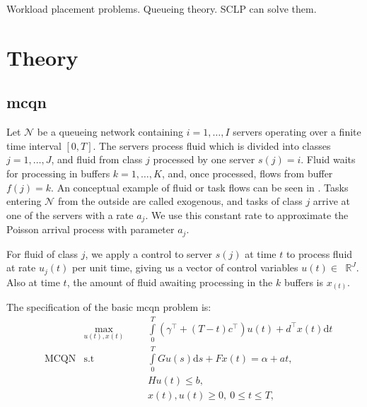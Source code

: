 \documentclass[11pt,a4paper,titlepage]{article}
\newcommand*{\RR}[1]{\ensuremath{\mathop{}\!\mathbb{R}^{#1}}}%
\newcommand*{\qnet}{\ensuremath{\mathcal{N}}}%
\theoremstyle{definition}
\begin{document}
Workload placement problems.
Queueing theory.
SCLP can solve them.



\section{Theory}
\label{sec:theory}


\subsection{\acrshort{mcqn}}
\label{subsec:theory:mcqn}

Let $\qnet$ be a queueing network containing $i = 1, \ldots, I$
servers operating over a finite time interval $[0,T]$.
The servers process fluid which is divided into classes $j = 1, \ldots, J$,
and fluid from class $j$ processed by one server $s(j) = i$.
Fluid waits for processing in buffers $k = 1, \ldots, K$,
and,
once processed,
flows from buffer $f(j) = k$.
An conceptual example of fluid or task flows can be seen in .
Tasks entering $\qnet$ from the outside are called exogenous,
and tasks of class $j$ arrive at one of the servers with a rate $a_j$.
We use this constant rate to approximate the Poisson arrival process
with parameter $a_j$.

For fluid of class $j$,
we apply a control to server $s(j)$ at time $t$
to process fluid at rate $u_j(t)$ per unit time,
giving us a vector of control variables $u(t) \in \RR{J}$.
Also at time $t$,
the amount of fluid awaiting processing in the $k$ buffers is $x_(t)$.

The specification of the basic \gls{mcqn} problem is:
\begin{align} \label{eq:mcqn}%
    && \max\limits_{u(t), x(t)} &&& \int\limits_0^T(\gamma^\top +
      (T-t)c^\top)u(t)+d^\top x(t)\mathrm{d}t \nonumber \\
    & \mbox{MCQN} & \mbox{s.t} &&& \int\limits_0^T G u(s)\mathrm{d}s +
      F x(t) = \alpha+at, \\
    &&&&& H u(t) \leq b, \nonumber \\
    &&&&& x(t), u(t) \geq 0, ~ 0 \leq t \leq T, \nonumber
\end{align}
\end{document}
